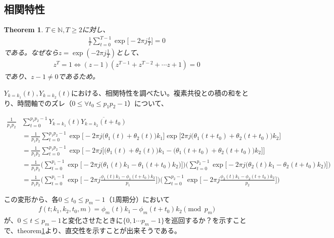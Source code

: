 \documentclass[platex]{jsarticle}
\newcommand{\expb}[1]{\exp \biggl[ #1 \biggr]}
\newtheorem{thm}{Theorem}
\begin{document}
\subsection{相関特性}


\begin{thm}
\label{th:1}
$T \in \mathbb{N}, T \geq 2$に対し、
\begin{gather}
    \frac{1}{T} \sum_{t=0}^{T-1} \expb { -2 \pi j
        \frac{t}{T}
    } = 0
\end{gather}
である。なぜなら$z = \exp (-2 \pi j \frac{1}{T})$として、
\begin{gather}
z^T = 1 \Longleftrightarrow (z-1)(z^{T-1} + z^{T-2} + \cdots z+1) = 0
\end{gather}
であり、$z-1\not=0$であるため。
\end{thm}

$Y_{k=k_1}(t), Y_{k=k_2}(t)$における、相関特性を調べたい。複素共役との積の和をとり、時間軸でのズレ（$0 \leq \forall t_0 \leq p_1p_2-1$）について、

\begin{align}
    \frac{1}{p_1p_2} & \sum_{t=0}^{p_1p_2-1} Y_{k=k_1}(t) \overline{Y_{k=k_2}(t+t_0)} \\
    &= \frac{1}{p_1p_2} \sum_{t=0}^{p_1p_2-1}
        \expb{-2 \pi j \biggl( \theta_1(t)+\theta_2(t) \biggr) k_1}
        \expb{2 \pi j \biggl( \theta_1(t+t_0)+\theta_2(t+t_0) \biggr) k_2} \\
    &= \frac{1}{p_1p_2} \sum_{t=0}^{p_1p_2-1} 
        \expb{-2 \pi j
            \biggl[
                \biggl( \theta_1(t)+\theta_2(t) \biggr) k_1 -
                \biggl( \theta_1(t+t_0)+\theta_2(t+t_0) \biggr) k_2
            \biggr]
        } \\
    &= \frac{1}{p_1p_2} 
    \biggl( 
        \sum_{t=0}^{p_1-1} \expb{-2 \pi j
            \biggl(
                \theta_1(t) k_1 - \theta_1(t+t_0) k_2
            \biggr)
        }
    \biggr)
    \biggl( 
        \sum_{t=0}^{p_2-1} \expb{-2 \pi j
            \biggl(
                \theta_2(t) k_1 - \theta_2(t+t_0) k_2
            \biggr)
        }
    \biggr) \\ 
    &= \frac{1}{p_1p_2} 
    \biggl( 
        \sum_{t=0}^{p_1-1} \expb{-2 \pi j
            \frac{\phi_1(t) k_1 - \phi_1(t+t_0) k_2}{p_1}
        }
    \biggr)
    \biggl( 
        \sum_{t=0}^{p_2-1} \expb{-2 \pi j
            \frac{\phi_2(t) k_1 - \phi_2(t+t_0) k_2}{p_2}
        }
    \biggr)
\end{align}

この変形から、各$0 \leq t_0 \leq p_m-1$（1周期分）において
\begin{gather}
f(t; k_1, k_2, t_0, m) = \phi_m(t) k_1 - \phi_m(t+t_0) k_2 \pmod{p_m} \label{eq:cross-core}
\end{gather}
が、$0\leq t \leq p_m -1$と変化させたときに$\{ 0, 1\cdots p_m-1 \}$を巡回するか？を示すことで、theorem\ref{th:1}より、直交性を示すことが出来そうである。
\end{document}
